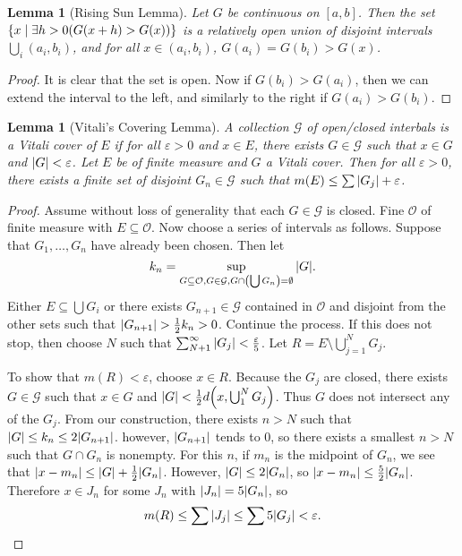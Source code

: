 \documentclass[leqno, openany]{memoir}
\newtheorem{lem}[thm]{Lemma}
\theoremstyle{definition}
\theoremstyle{remark}
\theoremstyle{plain}
\theoremstyle{definition}
\theoremstyle{remark}
\newcommand{\ep}{\varepsilon}
\newcommand{\mc}[1]{\mathcal{#1}}
\begin{document}
\begin{lem}[Rising Sun Lemma] Let $G$ be continuous on $[a,b]$. Then the set
    $\qty{x \mid \exists h > 0 (G(x+h) > G(x))}$ is a relatively open union of
    disjoint intervals $\bigcup_i (a_i,b_i)$, and for all $x \in (a_i, b_i)$,
    $G(a_i) = G(b_i) > G(x)$.  \end{lem}

\begin{proof} It is clear that the set is open. Now if $G(b_i) > G(a_i)$, then
we can extend the interval to the left, and similarly to the right if $G(a_i) >
G(b_i)$.  \end{proof}

\begin{lem}[Vitali's Covering Lemma] A collection $\mc{G}$ of open/closed
    interbals is a \textit{Vitali cover} of $E$ if for all $\ep > 0$ and $x \in
    E$, there exists $G \in \mc{G}$ such that $x \in G$ and $\abs{G} < \ep$.
    Let $E$ be of finite measure and $G$ a Vitali cover. Then for all $\ep >
    0$, there exists a finite set of disjoint $G_n \in \mc{G}$ such that $m(E)
    \leq \sum \abs{G_j} + \ep$.  \end{lem}

\begin{proof} Assume without loss of generality that each $G \in \mc{G}$ is
    closed. Fine $\mc{O}$ of finite measure with $E \subseteq \mc{O}$. Now
    choose a series of intervals as follows. Suppose that $G_1, \ldots, G_n$
    have already been chosen. Then let \[ k_n = \sup_{G \subseteq \mc{O}, G \in
    \mc{G}, G \cap \qty(\bigcup G_n) = \emptyset} \abs{G}. \] Either $E
    \subseteq \bigcup G_i$ or there exists $G_{n+1} \in \mc{G}$ contained in
    $\mc{O}$ and disjoint from the other sets such that $\abs{G_{n+1}} >
    \frac{1}{2} k_n > 0$. Continue the process. If this does not stop, then
    choose $N$ such that $\sum_{N+1}^{\infty} \abs{G_j} < \frac{\ep}{5}$. Let
    $R = E \setminus \bigcup_{j=1}^N G_j$.

    To show that $m(R) < \ep$, choose $x \in R$. Because the $G_j$ are closed,
    there exists $G \in \mc{G}$ such that $x \in G$ and $\abs{G} < \frac{1}{2}
    d\qty(x, \bigcup_1^N G_j)$. Thus $G$ does not intersect any of the $G_j$.
    From our construction, there exists $n > N$ such that $\abs{G} \leq k_n
    \leq 2 \abs{G_{n+1}}$. however, $\abs{G_{n+1}}$ tends to $0$, so there
    exists a smallest $n>N$ such that $G \cap G_n$ is nonempty. For this $n$,
    if $m_n$ is the midpoint of $G_n$, we see that $\abs{x - m_n} \leq \abs{G}
    + \frac{1}{2}\abs{G_n}$. However, $\abs{G} \leq 2 \abs{G_n}$, so $\abs{x -
    m_n} \leq \frac{5}{2} \abs{G_n}$. Therefore $x \in J_n$ for some $J_n$ with
    $\abs{J_n} = 5 \abs{G_n}$, so \[ m(R) \leq \sum \abs{J_j} \leq \sum 5
    \abs{G_j} < \ep. \qedhere \] \end{proof}
\end{document}
